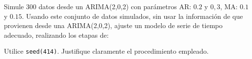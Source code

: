 
\addpoints
\question[40] Simule 300 datos desde un ARIMA(2,0,2) con parámetros AR: $0.2$ y $0,3$, MA: $0.1$ y $0.15$. Usando este conjunto de datos simulados, sin usar la información de que provienen desde una ARIMA(2,0,2), ajuste un modelo de serie de tiempo adecuado, realizando los etapas de: 
\noaddpoints
{}

Utilice \texttt{seed(414)}. Justifique claramente el procedimiento empleado.
